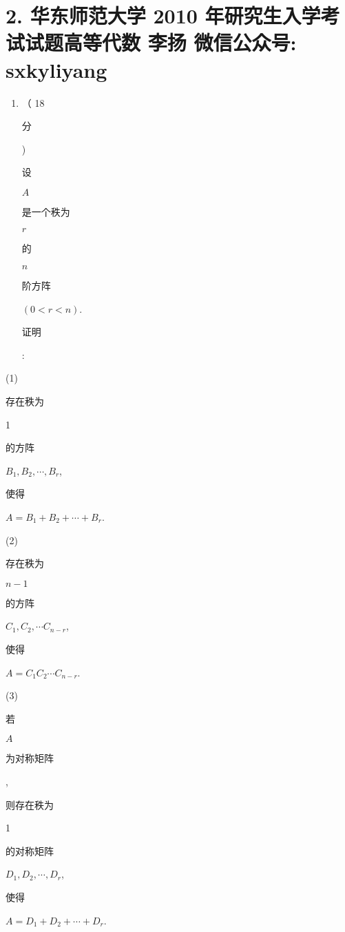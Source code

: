 \documentclass[10pt]{article}
\begin{document}
\section{2. 华东师范大学 2010 年研究生入学考试试题高等代数 
 李扬 
 微信公众号: sxkyliyang}
\begin{enumerate}
  \item （ 18 \begin{CJK}{UTF8}{mj}分\end{CJK}) \begin{CJK}{UTF8}{mj}设\end{CJK} $A$ \begin{CJK}{UTF8}{mj}是一个秩为\end{CJK} $r$ \begin{CJK}{UTF8}{mj}的\end{CJK} $n$ \begin{CJK}{UTF8}{mj}阶方阵\end{CJK} $(0<r<n)$. \begin{CJK}{UTF8}{mj}证明\end{CJK}:
\end{enumerate}
(1) \begin{CJK}{UTF8}{mj}存在秩为\end{CJK} 1 \begin{CJK}{UTF8}{mj}的方阵\end{CJK} $B_{1}, B_{2}, \cdots, B_{r}$, \begin{CJK}{UTF8}{mj}使得\end{CJK} $A=B_{1}+B_{2}+\cdots+B_{r}$.

(2) \begin{CJK}{UTF8}{mj}存在秩为\end{CJK} $n-1$ \begin{CJK}{UTF8}{mj}的方阵\end{CJK} $C_{1}, C_{2}, \cdots C_{n-r}$, \begin{CJK}{UTF8}{mj}使得\end{CJK} $A=C_{1} C_{2} \cdots C_{n-r}$.

(3) \begin{CJK}{UTF8}{mj}若\end{CJK} $A$ \begin{CJK}{UTF8}{mj}为对称矩阵\end{CJK}, \begin{CJK}{UTF8}{mj}则存在秩为\end{CJK} 1 \begin{CJK}{UTF8}{mj}的对称矩阵\end{CJK} $D_{1}, D_{2}, \cdots, D_{r}$, \begin{CJK}{UTF8}{mj}使得\end{CJK} $A=D_{1}+D_{2}+\cdots+D_{r}$.
\end{document}
